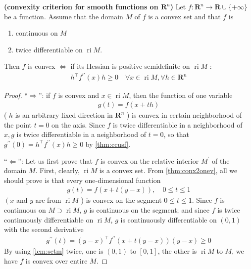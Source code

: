\documentclass{article}
\newcommand{\bfs}[1]{\textbf{({#1}) }}
\newcommand{\ri}{\operatorname{ri}}
\begin{document}
\begin{cora}\bfs{convexity criterion for smooth functions on $\mathbf{R}^{n}$}\label{cora:2_diff}
Let $f: \mathbf{R}^{n} \rightarrow \mathbf{R} \cup\{+\infty\}$ be a function. Assume that the domain $M$ of $f$ is a convex set and that $f$ is
\begin{enumerate}
    \item continuous on $M$
    \item twice differentiable on  $\ri M$.
\end{enumerate}
Then $f$ is convex $\Longleftrightarrow$ if its Hessian is positive semidefinite on  $\ri M$ :
\begin{align*}
h^{\top} f^{\prime \prime}(x) h \geq 0 \quad \forall x \in \operatorname{ri} M, \forall h \in \mathbf{R}^{n}
\end{align*}
\end{cora}
\begin{proof}\color{ForestGreen}
``$\Rightarrow$'': if $f$ is convex and $x \in \operatorname{ri} M$, then the function of one variable
\begin{align}
g(t)=f(x+t h)\label{eq:ffbac}
\end{align}
( $h$ is an arbitrary fixed direction in $\mathbf{R}^{n}$ ) is convex in certain neighborhood of the point $t=0$ on the axis. Since $f$ is twice differentiable in a neighborhood of $x, g$ is twice differentiable in a neighborhood of $t=0$, so that $g^{\prime \prime}(0)=h^{\top} f^{\prime \prime}(x) h \geq 0$ by \cref{thm:ccusf}.

``$\Leftarrow$'': Let us first prove that $f$ is convex on the relative interior $M^{\prime}$ of the domain $M$. First, clearly, $\ri M$ is a convex set. From \cref{thm:conx2onev}, all we should prove is that every one-dimensional function
\begin{align*}
g(t)=f(x+t(y-x)), \quad 0 \leq t \leq 1
\end{align*}
$\left(x\right.$ and $y$ are from $\ri M$ ) is convex on the segment $0 \leq t \leq 1$. Since $f$ is continuous on $M \supset\ri M$, $g$ is continuous on the segment; and since $f$ is twice continuously differentiable on $\ri M$, $g$ is continuously differentiable on $(0,1)$ with the second derivative
\begin{align*}
g^{\prime \prime}(t)=(y-x)^{\top} f^{\prime \prime}(x+t(y-x))(y-x) \geq 0
\end{align*}
By using \cref{lem:setm} twice, one is $(0,1)$ to $[0,1]$, the other is $\ri M$ to $M$, we have $f$ is convex over entire $M$.
\end{proof} 
\end{document}
